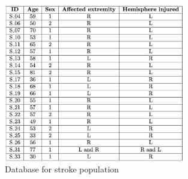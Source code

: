 \begin{figure}[ht]
    \centering
    \includegraphics[width=0.70\textwidth]{appendix/database_stroke.png}
    \caption{Database for stroke population}
    \label{fig: Database stroke}
\end{figure}

\clearpage

